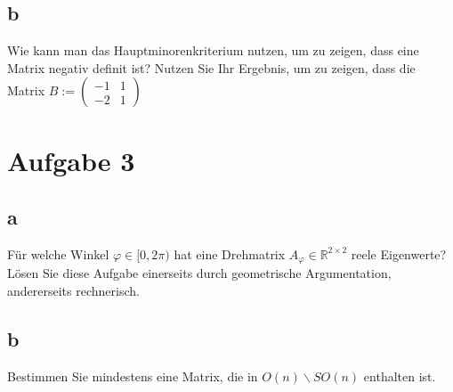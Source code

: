 \subsection{b}
Wie kann man das Hauptminorenkriterium nutzen, um zu zeigen, dass eine Matrix negativ definit ist? Nutzen Sie Ihr Ergebnis, um zu zeigen, dass die Matrix $B := \begin{pmatrix}
    -1 & 1 \\
    -2 & 1
\end{pmatrix}$

\section{Aufgabe 3}

\subsection{a}

Für welche Winkel $\varphi \in [0, 2\pi)$ hat eine Drehmatrix $A_\varphi \in \mathbb{R}^{2 \times 2}$ reele Eigenwerte? Lösen Sie diese Aufgabe einerseits durch geometrische Argumentation, andererseits rechnerisch.

\subsection{b}

Bestimmen Sie mindestens eine Matrix, die in $O(n) \backslash SO(n)$ enthalten ist.